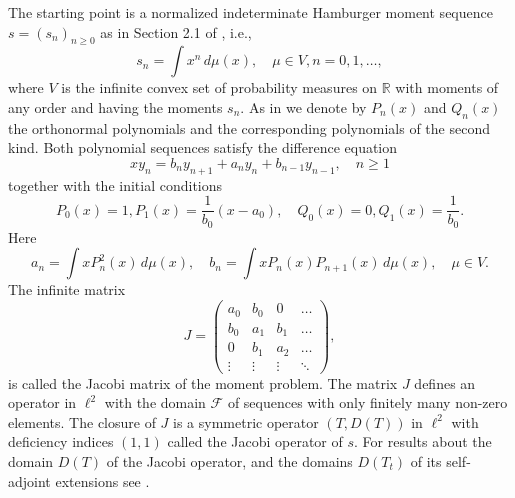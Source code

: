 \documentclass[12pt]{article}
\newcommand{\R}{\mathbb{R}}
\def\R{\mathbb{R}}
\begin{document}
The starting point is a normalized  indeterminate Hamburger moment sequence $s=(s_n)_{n\ge 0}$ as in Section 2.1 of \cite{B:V}, i.e., 
\begin{equation}\label{eq:mom}
s_n=\int x^n\,d\mu(x),\quad \mu\in V, n=0,1,\ldots, 
\end{equation}
where $V$ is the infinite convex set of probability measures on $\R$ with moments of any order and having the moments $s_n$.  As in \cite{B:V} we denote by $P_n(x)$ and $Q_n(x)$ the orthonormal polynomials and the corresponding polynomials of the second kind.
Both polynomial sequences satisfy the difference equation 
\begin{equation}\label{eq:3term}
xy_n=b_ny_{n+1}+a_ny_n+b_{n-1}y_{n-1},\quad n\ge 1
\end{equation}
together with the initial conditions
\begin{equation}\label{eq:initial}
P_0(x)=1, P_1(x)=\frac{1}{b_0}(x-a_0),\quad Q_0(x)=0, Q_1(x)=\frac{1}{b_0}.
\end{equation}
Here
\begin{equation}\label{eq:ab}
a_n=\int xP_n^2(x)\,d\mu(x),\quad b_n=\int xP_n(x)P_{n+1}(x)\,d\mu(x),\quad \mu\in V.
\end{equation}
The infinite matrix
\begin{equation}\label{eq:Jac}
J=\begin{pmatrix}
a_0 & b_0 & 0 & \hdots\\
b_0 & a_1 & b_1 & \hdots\\
0 & b_1 & a_2 & \hdots\\
\vdots &\vdots & \vdots & \ddots
\end{pmatrix},
\end{equation}
is called the Jacobi matrix of the moment problem. The matrix $J$ defines an operator in
$\ell^2$  with the  domain $\mathcal F$ of sequences with only finitely many non-zero elements. The closure of $J$ is a symmetric operator $(T,D(T))$ in $\ell^2$ with deficiency indices $(1,1)$ called the Jacobi operator of $s$. For results about the domain $D(T)$ of the Jacobi operator, and the domains $D(T_t)$ of its self-adjoint extensions see \cite{B:S}. 
\end{document}
